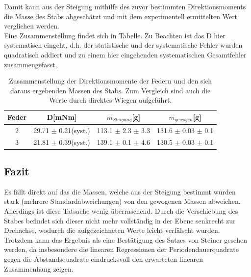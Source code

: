 \documentclass[12pt,a4paper]{article}
\begin{document}
Damit kann aus der Steigung mithilfe des zuvor bestimmten Direktionsmoments die Masse des Stabs abgeschätzt und mit dem experimentell ermittelten Wert verglichen werden.\\
Eine Zusammenstellung findet sich in Tabelle. Zu Beachten ist das D hier systematisch eingeht, d.h. der statistische und der systematische Fehler wurden quadratisch addiert und zu einem hier eingehenden systematischen Gesamtfehler zusammengefasst.

\begin{table}
\begin{center}
\begin{tabular}{|c|c|c|c|}
\hline
Feder & D[mNm] & $m_{Steigung}$[g] & $m_{gewogen}$[g] \\
\hline
2 & 29.71 $\pm$ 0.21(syst.) & 113.1 $\pm$ 2.3 $\pm$ 3.3 & 131.6 $\pm$ 0.03 $\pm$ 0.1\\
\hline
3 & 21.81 $\pm$ 0.39(syst.)& 139.1 $\pm$ 0.1 $\pm$ 4.6 & 130.5 $\pm$ 0.03 $\pm$ 0.1\\
\hline
\end{tabular}
\end{center}
\caption{Zusammenstellung der Direktionsmomente der Federn und den sich daraus ergebenden Massen des Stabs. Zum Vergleich sind auch die Werte durch direktes Wiegen aufgeführt.}
\label{tab:MassenReg}
\end{table}





\subsection{Fazit}
Es fällt direkt auf das die Massen, welche aus der Steigung bestimmt wurden stark (mehrere Standardabweichungen) von den gewogenen Massen abweichen.\\
Allerdings ist diese Tatsache wenig überraschend. Durch die Verschiebung des Stabes befindet sich dieser nicht mehr vollständig in der Ebene senkrecht zur Drehachse, wodurch die aufgezeichneten Werte leicht verfälscht wurden.\\
Trotzdem kann das Ergebnis als eine Bestätigung des Satzes von Steiner gesehen werden, da insbesondere die linearen Regressionen der Periodendauerquadrate gegen die Abstandsquadrate eindrucksvoll den erwarteten linearen Zusammenhang zeigen.
\end{document}
